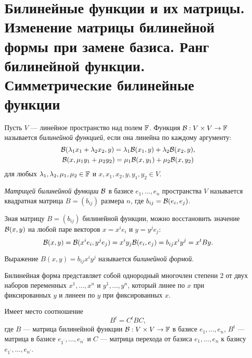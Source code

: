 \section{Билинейные функции и их матрицы. Изменение матрицы билинейной формы при замене базиса. Ранг билинейной функции. Симметрические билинейные функции}

\begin{definition}
    Пусть $V$ --- линейное пространство над полем $\mathbb{F}$. Функция $\mathcal{B}: V \times V \to \mathbb{F}$ называется \textit{билинейной функцией}, если она линейна по каждому аргументу:
    \begin{gather*}
        \mathcal{B}(\lambda_1x_1 + \lambda_2x_2, y) = \lambda_1\mathcal{B}(x_1, y) + \lambda_2\mathcal{B}(x_2, y),\\
        \mathcal{B}(x, \mu_1y_1 + \mu_2y_2) = \mu_1\mathcal{B}(x, y_1) + \mu_2\mathcal{B}(x, y_2)
    \end{gather*}
    для любых $\lambda_1, \lambda_2, \mu_1, \mu_2 \in \mathbb{F}$ и $x, x_1, x_2, y, y_1, y_2 \in V$.
\end{definition}

\begin{definition}
    \textit{Матрицей билинейной функции} $\mathcal{B}$ в базисе $e_1, \ldots, e_n$ пространства $V$ называется квадратная матрица $B = (b_{ij})$ размера $n$, где $b_{ij} = \mathcal{B}(e_i, e_j)$.
\end{definition}

Зная матрицу $B = (b_{ij})$ билинейной функции, можно восстановить значение $\mathcal{B}(x, y)$ на любой паре векторов $x = x^ie_i$ и $y = y^je_j$:
\[
    \mathcal{B}(x, y) = \mathcal{B}(x^ie_i, y^je_j) = x^iy_j\mathcal{B}(e_i, e_j) = b_{ij}x^iy^j = x^tBy.
\]

\begin{definition}
    Выражение $B(x, y) = b_{ij}x^iy^j$ называется \textit{билинейной формой}.
\end{definition}

Билинейная форма представляет собой однородный многочлен степени $2$ от двух наборов переменных $x^1, \ldots, x^n$ и $y^1, \ldots, y^n$, который линее по $x$ при фиксированных $y$ и линеен по $y$ при фиксированных $x$.

\begin{theorem}
    Имеет место соотношение
    \[
        B^t = C^tBC,
    \]
    где $B$ --- матрица билинейной функции $\mathcal{B}: V \times V \to \mathbb{F}$ в базисе $e_1, \ldots, e_n$, $B^t$ --- матрица в базисе $e_{1^\prime}, \ldots, e_{n^\prime}$ и $C$ --- матрица перехода от базиса $e_1, \ldots, e_n$ к базису $e_{1^\prime}, \ldots, e_{n^\prime}$.
\end{theorem}


